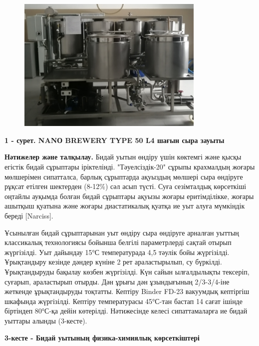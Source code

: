 \begin{figure}[H]
	\centering
	\includegraphics[width=0.8\textwidth]{media/pish3/image4}
	\caption*{}
\end{figure}


{\bfseries 1 - сурет. NANО BREWERY TYPE 50 L4 шағын сыра зауыты}

{\bfseries Нәтижелер және талқылау.} Бидай уытын өндіру үшін көктемгі және
қысқы егістік бидай сұрыптары іріктелінді. "Тәуелсіздік-20" сұрыпы
крахмалдың жоғары мөлшерімен сипатталса, барлық сұрыптарда ақуыздың
мөлшері сыра өндіруге рұқсат етілген шектерден (8-12\%) сәл асып түсті.
Суға сезімталдық көрсеткіші оңтайлы ауқымда болған бидай сұрыптары
ақуызы жоғары еритімділікке, жоғары ашытқыш қуатына және жоғары
диастатикалық қуатқа ие уыт алуға мүмкіндік береді {[}Narciss{]}.

Ұсынылған бидай сұрыптарынан уыт өндіру сыра өндіруге арналған уыттың
классикалық технологиясы бойынша белгілі параметрлерді сақтай отырып
жүргізілді. Уыт дайындау 15°С температурада 4,5 тәулік бойы жүргізілді.
Ұрықтандыру кезінде дәндер күніне 2 рет араластырылып, су бүркілді.
Ұрықтандыруды бақылау көзбен жүргізілді. Күн сайын ылғалдылықты
тексеріп, суғарып, араластырып отырды. Дән ұрығы дән ұзындығының
2/3-3/4-іне жеткенде ұрықтандыруды тоқтатты. Кептіру Binder FD-23
вакуумдық кептіргіш шкафында жүргізілді. Кептіру температурасы 45°С-тан
бастап 14 сағат ішінде біртіндеп 80°С-қа дейін көтерілді. Нәтижесінде
келесі сипаттамаларға ие бидай уыттары алынды (3-кесте).

{\bfseries 3-кесте - Бидай уытының физика-химиялық көрсеткіштері}

